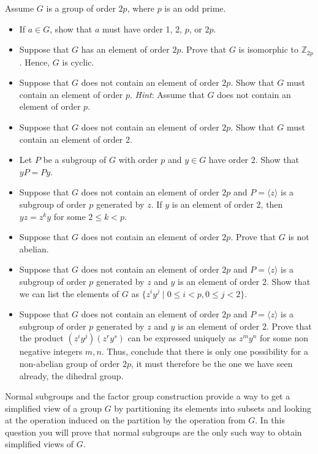 \documentclass[oneside,10pt]{amsart}
\begin{document}
Assume \(G\) is a group of order \(2p\), where \(p\) is an odd prime.
\begin{itemize}
\item\hypertarget{li-370}{}If \(a \in G\), show that \(a\) must have order 1, 2, \(p\), or \(2p\).%
\item\hypertarget{li-371}{}Suppose that \(G\) has an element of order \(2p\).  Prove that \(G\) is isomorphic to \({\mathbb Z}_{2p}\).  Hence, \(G\) is cyclic.%
\item\hypertarget{li-372}{}Suppose that \(G\) does not contain an element of order \(2p\).  Show that \(G\) must contain an element of order \(p\).  {\em Hint}:  Assume that \(G\) does not contain an element of order \(p\).%
\item\hypertarget{li-373}{}Suppose that \(G\) does not contain an element of order \(2p\).  Show that \(G\) must contain an element of order 2.%
\item\hypertarget{li-374}{}Let \(P\) be a subgroup of \(G\) with order \(p\) and \(y \in G\) have order 2.  Show that \(yP = Py\).%
\item\hypertarget{li-375}{}Suppose that \(G\) does not contain an element of order \(2p\) and \(P = \langle z \rangle\) is a subgroup of order \(p\) generated by \(z\).  If \(y\) is an element of order 2, then \(yz = z^ky\) for some \(2 \leq k < p\).%
\item\hypertarget{li-376}{}Suppose that \(G\) does not contain an element of order \(2p\).  Prove that \(G\) is not abelian.%
\item\hypertarget{li-377}{}Suppose that \(G\) does not contain an element of order \(2p\) and \(P = \langle z \rangle\) is a subgroup of order \(p\) generated by \(z\) and \(y\) is an element of order 2. Show that we can list the elements of \(G\) as \(\{z^iy^j\mid 0\leq i < p, 0\leq j < 2\}\).%
\item\hypertarget{li-378}{}Suppose that \(G\) does not contain an element of order \(2p\) and \(P = \langle z \rangle\) is a subgroup of order \(p\) generated by \(z\) and \(y\) is an element of order 2.  Prove that the product \((z^iy^j)(z^ry^s)\) can be expressed uniquely as \(z^m y^n\) for some non negative integers \(m, n\).  Thus, conclude that there is only one possibility for a non-abelian group of order \(2p\), it must therefore be the one we have seen already, the dihedral group.%
\end{itemize}

Normal subgroups and the factor group construction provide a way to get a simplified view of a group $G$ by partitioning its elements into subsets and looking at the operation induced on the partition by the operation from $G$. In this question you will prove that normal subgroups are the only such way to obtain simplified views of $G$.
\end{document}
